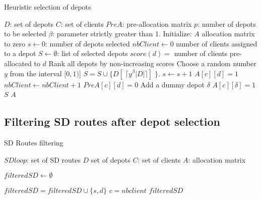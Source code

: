 \documentclass[10pt, a4paper]{article}
\begin{document}
\begin{algorithm}
	\caption{Heuristic selection of depots}
	\label{algo:location-sampling}
	\begin{algorithmic}[1]
		\REQUIRE $D$: set of depots
		\REQUIRE $C$: set of clients
		\REQUIRE $PreA$: pre-allocation matrix
		\REQUIRE $p$: number of depots to be selected
		\REQUIRE $\beta$: parameter strictly greater than 1.
		\STATE Initialize: $A$ allocation matrix to zero
		\STATE $s\leftarrow 0$: number of depots selected
		\STATE $nbClient \leftarrow 0$ number of clients assigned to a depot
		\STATE $S \leftarrow \emptyset$: list of selected depots
				\STATE $score(d) =$ number of clients pre-allocated to $d$
			\ENDFOR
			\STATE Rank all depots by non-increasing scores
			\STATE Choose a random number $y$ from the interval $[0,1)$]
			\STATE $ S = S \cup \{D[\;\lceil y^\beta |D| \rceil]\; \}$.
			\STATE $s \leftarrow s +1$
					\STATE $A[c][d] = 1$
					\STATE $nbClient \leftarrow nbClient +1$
						\STATE $PreA[c][d] = 0$
					\ENDFOR
				\ENDIF		
			\ENDFOR
		\ENDWHILE
			\STATE Add a dummy depot $\delta$
				\STATE $A[c][\delta]=1$
			\ENDFOR
		\ENDIF
		\RETURN $S$
		\RETURN $A$
	\end{algorithmic}
\end{algorithm}



\newpage
\subsection{Filtering SD routes after depot selection}

\begin{algorithm}
	\caption{SD Routes filtering}
	\label{algo:filtering}
	\begin{algorithmic}[1]
		\REQUIRE $SDloop$: set of SD routes
		\REQUIRE $D$ set of depots
		\REQUIRE $C$: set of clients
		\REQUIRE $A$: allocation matrix
		
		\STATE $filteredSD \leftarrow \emptyset$
		
					\STATE $filteredSD = filteredSD \cup \{s,d\}$
					\STATE $c = nbclient$
				\ENDIF
			\ENDFOR
		\ENDFOR
		\RETURN $filteredSD$
	\end{algorithmic}
\end{algorithm}
\end{document}
